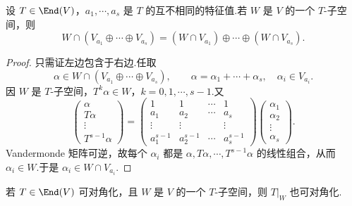 \begin{lemma}
	设 $T\in\End(V)$，$a_1,\cdots,a_s$ 是 $T$ 的互不相同的特征值.若 $W$ 是 $V$ 的一个 $T$-子空间，则
	\[
	W\cap(V_{a_1}\oplus\cdots\oplus V_{a_s})
	=(W\cap V_{a_1})\oplus\cdots\oplus(W\cap V_{a_s}).
	\]
\end{lemma}

\begin{proof}
	只需证左边包含于右边.任取
	\[
	\alpha\in W\cap(V_{a_1}\oplus\cdots\oplus V_{a_s}),
	\qquad
	\alpha=\alpha_1+\cdots+\alpha_s,
	\quad \alpha_i\in V_{a_i}.
	\]
	因 $W$ 是 $T$-子空间，$T^k\alpha\in W$，$k=0,1,\cdots,s-1$.又
	\[
	\begin{pmatrix}
		\alpha\\ T\alpha\\ \vdots\\ T^{s-1}\alpha
	\end{pmatrix}
	=
	\begin{pmatrix}
		1&1&\cdots&1\\
		a_1&a_2&\cdots&a_s\\
		\vdots&\vdots&&\vdots\\
		a_1^{s-1}&a_2^{s-1}&\cdots&a_s^{s-1}
	\end{pmatrix}
	\begin{pmatrix}
		\alpha_1\\ \alpha_2\\ \vdots\\ \alpha_s
	\end{pmatrix}.
	\]
	Vandermonde 矩阵可逆，故每个 $\alpha_i$ 都是 $\alpha,T\alpha,\cdots,T^{s-1}\alpha$ 的线性组合，从而 $\alpha_i\in W$.于是 $\alpha_i\in W\cap V_{a_i}$.
\end{proof}

\begin{corollary}
	若 $T\in\End(V)$ 可对角化，且 $W$ 是 $V$ 的一个 $T$-子空间，则 $T|_W$ 也可对角化.
\end{corollary}

